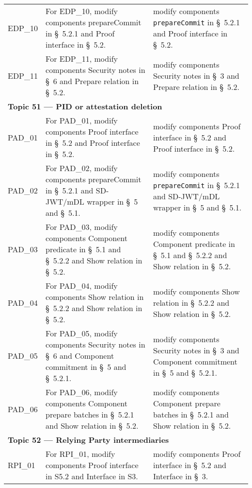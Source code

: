 \begin{landscape}
\begin{longtable}{p{3cm} p{10cm} p{7cm}}
EDP\_10 &
For EDP\_10, modify components prepareCommit in \S~5.2.1 and Proof interface in \S~5.2. &
modify components \texttt{prepareCommit} in \S~5.2.1 and Proof interface in \S~5.2. \\

EDP\_11 &
For EDP\_11, modify components Security notes in \S~6 and Prepare relation in \S~5.2. &
modify components Security notes in \S~3 and Prepare relation in \S~5.2. \\[1em]


\multicolumn{3}{l}{\textbf{Topic 51 — PID or attestation deletion}}\\

PAD\_01 &
For PAD\_01, modify components Proof interface in \S~5.2 and Proof interface in \S~5.2. &
modify components Proof interface in \S~5.2 and Proof interface in \S~5.2. \\

PAD\_02 &
For PAD\_02, modify components prepareCommit in \S~5.2.1 and SD-JWT/mDL wrapper in \S~5 and \S~5.1. &
modify components \texttt{prepareCommit} in \S~5.2.1 and SD-JWT/mDL wrapper in \S~5 and \S~5.1. \\

PAD\_03 &
For PAD\_03, modify components Component predicate in \S~5.1 and \S~5.2.2 and Show relation in \S~5.2. &
modify components Component predicate in \S~5.1 and \S~5.2.2 and Show relation in \S~5.2. \\

PAD\_04 &
For PAD\_04, modify components Show relation in \S~5.2.2 and Show relation in \S~5.2. &
modify components Show relation in \S~5.2.2 and Show relation in \S~5.2. \\

PAD\_05 &
For PAD\_05, modify components Security notes in \S~6 and Component commitment in \S~5 and \S~5.2.1. &
modify components Security notes in \S~3 and Component commitment in \S~5 and \S~5.2.1. \\

PAD\_06 &
For PAD\_06, modify components Component prepare batches in \S~5.2.1 and Show relation in \S~5.2. &
modify components Component prepare batches in \S~5.2.1 and Show relation in \S~5.2. \\[1em]


\multicolumn{3}{l}{\textbf{Topic 52 — Relying Party intermediaries}}\\

RPI\_01 & 
For RPI\_01, modify components Proof interface in S5.2 and Interface in S3. &
modify components Proof interface in \S~5.2 and Interface in \S~3. \\


\end{longtable}
\end{landscape}
